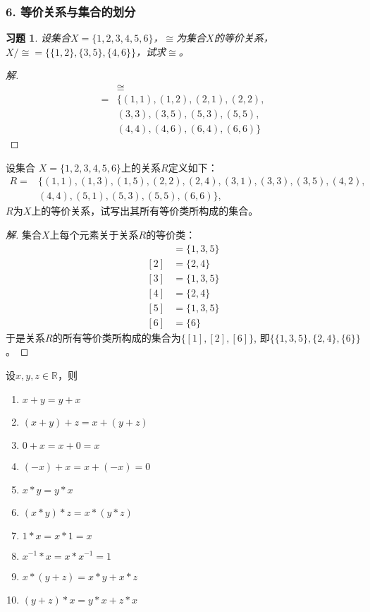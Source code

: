 \documentclass{beamer}
\newtheorem*{Exercise}{习题}
\begin{document}
\begin{CJK*}{UTF8}{gbsn}
\begin{frame}
\end{frame}
\begin{frame}
  \frametitle{6. 等价关系与集合的划分}
  \begin{Exercise}
    设集合$X=\{1,2,3,4,5,6\}$，$\cong$为集合$X$的等价关系，$X/\cong=\{\{1,2\},\{3,5\},\{4,6\}\}$，试求$\cong$。
  \end{Exercise}\pause
  \begin{proof}[解]
    \begin{align*}
      &\cong\\
      =&\{(1,1),(1,2),(2,1),(2,2),\\
      &(3,3),(3,5),(5,3),(5,5),\\
      &(4,4),(4,6),(6,4),(6,6)\}
    \end{align*}
  \end{proof}
\end{frame}
\begin{frame}
  \begin{Ex}
    设集合
    $X=\{1,2,3,4,5,6 \}$上的关系$R$定义如下：
    \begin{align*}
      R=&\{(1,1),(1,3),(1,5),(2,2),(2,4),(3,1),(3,3),(3,5),(4,2),\\
      &(4,4),(5,1),(5,3),(5,5),(6,6)\},
    \end{align*}
      $R$为$X$上的等价关系，试写出其所有等价类所构成的集合。
    \end{Ex}
    {\small
    \begin{proof}[解]
      集合$X$上每个元素关于关系$R$的等价类：
      \begin{align*}
        [1]&=\{1,3,5\}\\
        [2]&=\{2,4\}\\
        [3]&=\{1,3,5\}\\
        [4]&=\{2,4\}\\
        [5]&=\{1,3,5\}\\
        [6]&=\{6\}
      \end{align*}
      于是关系$R$的所有等价类所构成的集合为$\{[1],[2],[6]\}$, 即$\{\{1,3,5\},\{2,4\},\{6\}\}$。
    \end{proof}
    }
\end{frame}

\begin{frame}
      设$x, y, z \in \mathbb{R}$，则
   \begin{enumerate}
   \item   $x + y = y + x$
   \item   $(x + y) + z = x + (y + z)$
   \item   $0 + x = x + 0 = x$
   \item   $(-x) + x =x + (-x) = 0$
   \item   $x * y = y * x$
   \item   $(x * y) * z = x * (y *z)$
   \item   $1 * x = x * 1 = x$
   \item   $x^{-1} * x = x * x^{-1} = 1$
   \item   $x* (y + z) = x * y + x * z$
   \item   $(y + z) * x = y * x + z * x$
    \end{enumerate}
  \end{frame}


\end{CJK*}
\end{document}
